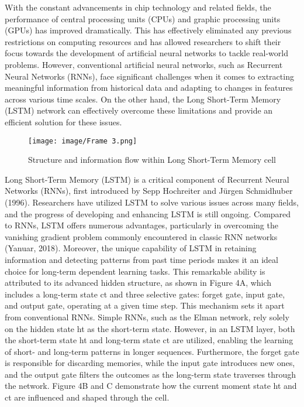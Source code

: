 \documentclass[sn-mathphys,Numbered]{sn-jnl}%
\theoremstyle{thmstyleone}%
\theoremstyle{thmstyletwo}%
\theoremstyle{thmstylethree}%
\begin{document}
With the constant advancements in chip technology and related fields, the performance of central processing units (CPUs) and graphic processing units (GPUs) has improved dramatically. This has effectively eliminated any previous restrictions on computing resources and has allowed researchers to shift their focus towards the development of artificial neural networks to tackle real-world problems. However, conventional artificial neural networks, such as Recurrent Neural Networks (RNNs), face significant challenges when it comes to extracting meaningful information from historical data and adapting to changes in features across various time scales. On the other hand, the Long Short-Term Memory (LSTM) network can effectively overcome these limitations and provide an efficient solution for these issues.

\begin{figure}[htp]
    \centering
    \texttt{[image: image/Frame 3.png]}
    \caption{\centering  Structure and information flow within Long Short-Term Memory cell}
    \label{fig:LSTM}
\end{figure}

 Long Short-Term Memory (LSTM) is a critical component of Recurrent Neural Networks (RNNs), first introduced by Sepp Hochreiter and Jürgen Schmidhuber (1996). Researchers have utilized LSTM to solve various issues across many fields, and the progress of developing and enhancing LSTM is still ongoing. Compared to RNNs, LSTM offers numerous advantages, particularly in overcoming the vanishing gradient problem commonly encountered in classic RNN networks (Yanuar, 2018). Moreover, the unique capability of LSTM in retaining information and detecting patterns from past time periods makes it an ideal choice for long-term dependent learning tasks. This remarkable ability is attributed to its advanced hidden structure, as shown in Figure 4A, which includes a long-term state ct and three selective gates: forget gate, input gate, and output gate, operating at a given time step. This mechanism sets it apart from conventional RNNs. Simple RNNs, such as the Elman network, rely solely on the hidden state ht as the short-term state. However, in an LSTM layer, both the short-term state ht and long-term state ct are utilized, enabling the learning of short- and long-term patterns in longer sequences. Furthermore, the forget gate is responsible for discarding memories, while the input gate introduces new ones, and the output gate filters the outcomes as the long-term state traverses through the network. Figure 4B and C demonstrate how the current moment state ht and ct are influenced and shaped through the cell.
\end{document}
